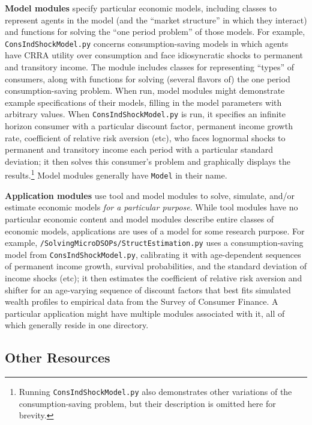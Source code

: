 \documentclass[12pt,titlepage,letterpaper]{econtex}
\begin{document}
\textbf{Model modules} specify particular economic models, including classes to represent agents in the model (and the ``market structure'' in which they interact) and functions for solving the ``one period problem'' of those models.  For example, \texttt{ConsIndShockModel.py} concerns consumption-saving models in which agents have CRRA utility over consumption and face idiosyncratic shocks to permanent and transitory income.  The module includes classes for representing ``types'' of consumers, along with functions for solving (several flavors of) the one period consumption-saving problem.  When run, model modules might demonstrate example specifications of their models, filling in the model parameters with arbitrary values.  When \texttt{ConsIndShockModel.py} is run, it specifies an infinite horizon consumer with a particular discount factor, permanent income growth rate, coefficient of relative risk aversion (etc), who faces lognormal shocks to permanent and transitory income each period with a particular standard deviation; it then solves this consumer's problem and graphically displays the results.\footnote{Running \texttt{ConsIndShockModel.py} also demonstrates other variations of the consumption-saving problem, but their description is omitted here for brevity.}  Model modules generally have \texttt{Model} in their name.

\textbf{Application modules} use tool and model modules to solve, simulate, and/or estimate economic models \textit{for a particular purpose}.  While tool modules have no particular economic content and model modules describe entire classes of economic models, applications are uses of a model for some research purpose.  For example, \texttt{/SolvingMicroDSOPs/StructEstimation.py} uses a consumption-saving model from \texttt{ConsIndShockModel.py}, calibrating it with age-dependent sequences of permanent income growth, survival probabilities, and the standard deviation of income shocks (etc); it then estimates the coefficient of relative risk aversion and shifter for an age-varying sequence of discount factors that best fits simulated wealth profiles to empirical data from the Survey of Consumer Finance.  A particular application might have multiple modules associated with it, all of which generally reside in one directory.

\subsection{Other Resources}\label{sec:OtherResources}
\end{document}
